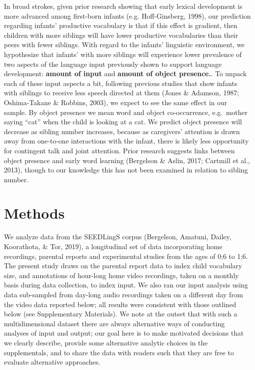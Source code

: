 \documentclass[
  english,
  man,floatsintext]{apa6}
\begin{document}
In broad strokes, given prior research showing that early lexical development is more advanced among first-born infants (e.g. Hoff-Ginsberg, 1998), our prediction regarding infants' productive vocabulary is that if this effect is gradient, then children with more siblings will have lower productive vocabularies than their peers with fewer siblings. With regard to the infants' linguistic environment, we hypothesize that infants' with more siblings will experience lower prevalence of two aspects of the language input previously shown to support language development: \textbf{amount of input} and \textbf{amount of object presence.}. To unpack each of these input aspects a bit, following previous studies that show infants with siblings to receive less speech directed at them (Jones \& Adamson, 1987; Oshima-Takane \& Robbins, 2003), we expect to see the same effect in our sample. By object presence we mean word and object co-occurrence, e.g.~mother saying ``cat'' when the child is looking at a cat. We predict object presence will decrease as sibling number increases, because as caregivers' attention is drawn away from one-to-one interactions with the infant, there is likely less opportunity for contingent talk and joint attention. Prior research suggests links between object presence and early word learning (Bergelson \& Aslin, 2017; Cartmill et al., 2013), though to our knowledge this has not been examined in relation to sibling number.

\hypertarget{methods}{%
\section{Methods}\label{methods}}

We analyze data from the SEEDLingS corpus (Bergelson, Amatuni, Dailey, Koorathota, \& Tor, 2019), a longitudinal set of data incorporating home recordings, parental reports and experimental studies from the ages of 0;6 to 1;6. The present study draws on the parental report data to index child vocabulary size, and annotations of hour-long home video recordings, taken on a monthly basis during data collection, to index input. We also ran our input analysis using data sub-sampled from day-long audio recordings taken on a different day from the video data reported below; all results were consistent with those outlined below (see Supplementary Materials). We note at the outset that with such a multidimensional dataset there are always alternative ways of conducting analyses of input and output; our goal here is to make motivated decisions that we clearly describe, provide some alternative analytic choices in the supplementals, and to share the data with readers such that they are free to evaluate alternative approaches.
\end{document}
